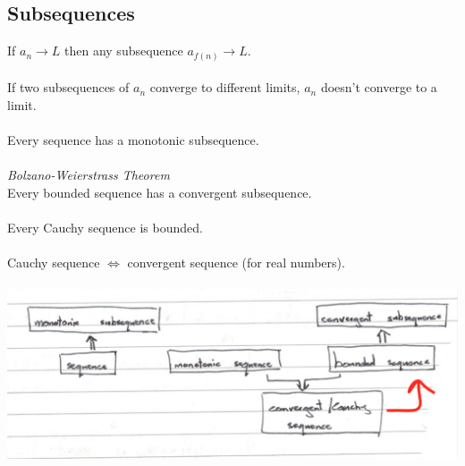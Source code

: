 \documentclass{article}
\begin{document}
\subsection{Subsequences}
If $ a_{n} \to L $ then any subsequence $ a_{f(n)} \to L $.
\\\\
If two subsequences of $ a_{n} $ converge to different limits, $ a_{n} $ doesn't converge to a limit.
\\\\
Every sequence has a monotonic subsequence.
\\\\
\textit{Bolzano-Weierstrass Theorem}
\\
Every bounded sequence has a convergent subsequence.
\\\\
Every Cauchy sequence is bounded.
\\\\
Cauchy sequence $ \Leftrightarrow $ convergent sequence (for real numbers).
\\\\
\hspace*{-1in}
\includegraphics[scale=0.4]{sequences}
\end{document}
